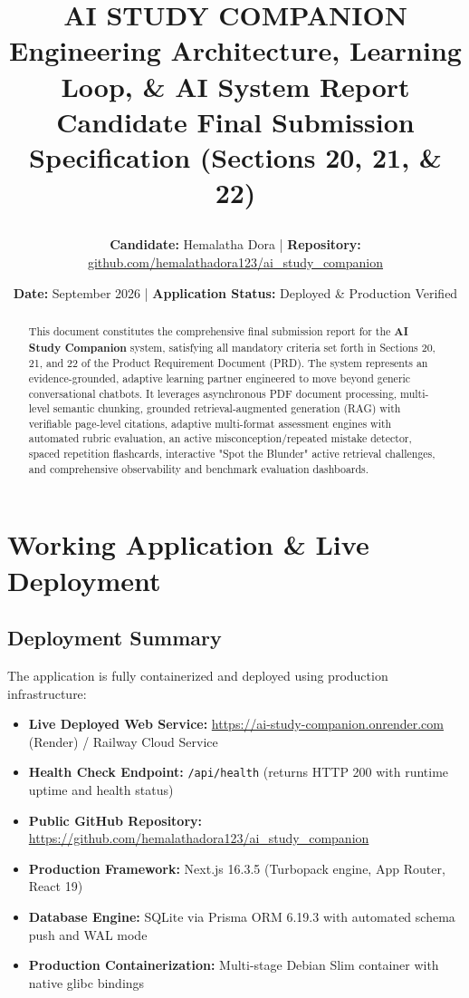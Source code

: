 \documentclass[11pt,a4paper]{article}
\title{
    \vspace{-1.5cm}
    \begin{tcolorbox}[colback=primary,colframe=primary,arc=4mm,boxrule=0pt,halign=center]
        \color{white}
        \Huge\textbf{AI STUDY COMPANION}\\[0.3cm]
        \Large\textbf{Engineering Architecture, Learning Loop, \& AI System Report}\\[0.2cm]
        \normalsize Candidate Final Submission Specification (Sections 20, 21, \& 22)
    \end{tcolorbox}
    \vspace{-0.5cm}
}
\author{\textbf{Candidate:} Hemalatha Dora \quad | \quad \textbf{Repository:} \href{https://github.com/hemalathadora123/ai_study_companion}{github.com/hemalathadora123/ai\_study\_companion}}
\date{\textbf{Date:} September 2026 \quad | \quad \textbf{Application Status:} Deployed \& Production Verified}
\begin{document}
\maketitle

\begin{abstract}
\noindent This document constitutes the comprehensive final submission report for the \textbf{AI Study Companion} system, satisfying all mandatory criteria set forth in Sections 20, 21, and 22 of the Product Requirement Document (PRD). The system represents an evidence-grounded, adaptive learning partner engineered to move beyond generic conversational chatbots. It leverages asynchronous PDF document processing, multi-level semantic chunking, grounded retrieval-augmented generation (RAG) with verifiable page-level citations, adaptive multi-format assessment engines with automated rubric evaluation, an active misconception/repeated mistake detector, spaced repetition flashcards, interactive "Spot the Blunder" active retrieval challenges, and comprehensive observability and benchmark evaluation dashboards.
\end{abstract}

\tableofcontents
\newpage

\section{Working Application \& Live Deployment}

\subsection{Deployment Summary}
The application is fully containerized and deployed using production infrastructure:
\begin{itemize}[noitemsep]
    \item \textbf{Live Deployed Web Service:} \url{https://ai-study-companion.onrender.com} (Render) / Railway Cloud Service
    \item \textbf{Health Check Endpoint:} \texttt{/api/health} (returns HTTP 200 with runtime uptime and health status)
    \item \textbf{Public GitHub Repository:} \url{https://github.com/hemalathadora123/ai_study_companion}
    \item \textbf{Production Framework:} Next.js 16.3.5 (Turbopack engine, App Router, React 19)
    \item \textbf{Database Engine:} SQLite via Prisma ORM 6.19.3 with automated schema push and WAL mode
    \item \textbf{Production Containerization:} Multi-stage Debian Slim container with native glibc bindings
\end{itemize}
\end{document}
